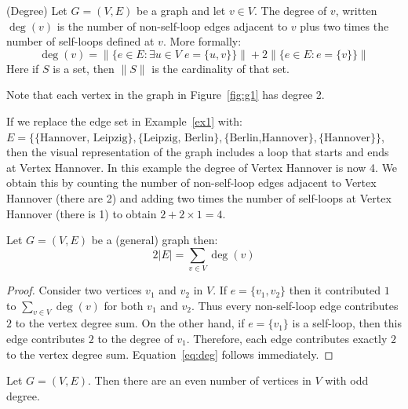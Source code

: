 %
\begin{definition}{(Degree)}
Let \(G = (V, E)\) be a graph and let \(v\in V\).
The degree of \(v\), written \(\deg(v)\) is the number of non-self-loop edges adjacent to \(v\) plus two times the number of self-loops defined at \(v\).
More formally:
\[ \deg(v) = \|\{ e\in E : \exists u\in V\; e = \{u, v\}\}\|+ 2 \|\{e \in E : e = \{v\}\}\| \]
Here if \(S\) is a set, then \(\|S\|\) is the cardinality of that set.
\end{definition}
%
\begin{remark}
Note that each vertex in the graph in Figure~\ref{fig:g1} has degree 2.
\end{remark}
%
\begin{example}If we replace the edge set in Example~\ref{ex1} with: \(E = \{\{\text{Hannover, Leipzig}\}, \allowbreak \{\text{Leipzig, Berlin}\}, \allowbreak \{\text{Berlin,Hannover}\}, \allowbreak \{\text{Hannover}\}\}\), then the visual representation of the graph includes a loop that starts and ends at Vertex Hannover.
In this example the degree of Vertex Hannover is now 4.
We obtain this by counting the number of non-self-loop edges adjacent to Vertex Hannover (there are 2) and adding two times the number of self-loops at Vertex Hannover (there is 1) to obtain \(2 + 2 \times 1 = 4\).
\end{example}
%

\begin{theorem}\label{thm:deg}
Let \(G = (V, E)\) be a (general) graph then:
\begin{equation}\label{eq:deg}
2|E| = \sum_{v\in V}  \deg(v)
\end{equation}
\end{theorem}
%
\begin{proof}
Consider two vertices \(v_1\) and \(v_2\) in \(V\).
If \(e = \{v_1, v_2\}\) then it contributed $1$ to  \(\sum_{v\in V}  \deg(v)\) for both \(v_1\) and \(v_2\).
Thus every non-self-loop edge contributes \(2\) to the vertex degree sum.
On the other hand, if \(e = \{v_1\}\) is a self-loop, then this edge contributes \(2\) to the degree of \(v_1\).
Therefore, each edge contributes exactly \(2\) to the vertex degree sum.
Equation~\ref{eq:deg} follows immediately.
\end{proof}
%
\begin{corollary}\label{cor:evenodd}
Let \(G = (V, E)\).
Then there are an even number of vertices in \(V\) with odd degree.
\end{corollary}


